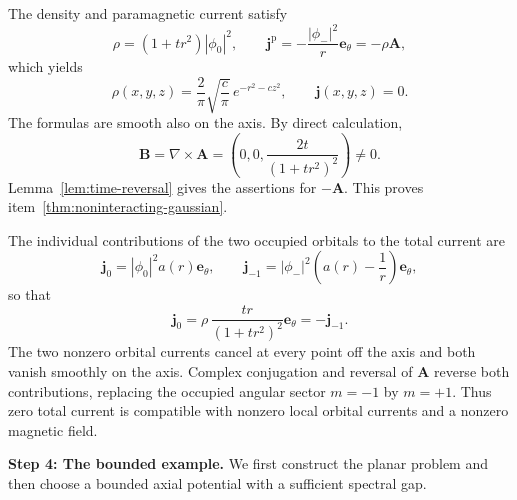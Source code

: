 \documentclass[11pt,a4paper]{article}
\theoremstyle{remark}
\theoremstyle{plain}
\newcommand{\jp}{\mathbf j^{\mathrm p}}
\newcommand{\jj}{\mathbf j}
\newcommand{\A}{\mathbf A}
\newcommand{\B}{\mathbf B}
\newcommand{\ee}{\mathbf e_\theta}
\begin{document}
The density and paramagnetic current satisfy
\begin{equation*}
 \rho=(1+tr^2)|\phi_0|^2,\qquad
 \jp=-\frac{|\phi_-|^2}{r}\ee=-\rho\A,
\end{equation*}
which yields
\begin{equation}
 \rho(x,y,z)=\frac2\pi\sqrt{\frac c\pi}\,e^{-r^2-cz^2},
 \qquad \jj(x,y,z)=0.
 \label{eq:gaussian-density-current}
\end{equation}The formulas are
smooth also on the axis. By direct calculation,
\begin{equation*}
 \B=\nabla\times\A=
 \left(0,0,\frac{2t}{(1+tr^2)^2}\right)\ne0.
\end{equation*}
Lemma~\ref{lem:time-reversal} gives the assertions for $-\A$.
This proves item~\ref{thm:noninteracting-gaussian}.

The individual contributions of the two occupied orbitals
to the total current are
\begin{equation*}
 \jj_0=|\phi_0|^2a(r)\ee,\qquad
 \jj_{-1}=|\phi_-|^2\left(a(r)-\frac1r\right)\ee,
\end{equation*}
so that
\begin{equation}
 \jj_0=\rho\,\frac{tr}{(1+tr^2)^2}\ee=-\jj_{-1}.
 \label{eq:orbital-current-cancellation}
\end{equation}
The two nonzero orbital currents cancel at every point off the axis
and both vanish smoothly on the axis. Complex conjugation and reversal
of $\A$ reverse both contributions, replacing the occupied angular
sector $m=-1$ by $m=+1$. Thus zero total current is compatible with
nonzero local orbital currents and a nonzero magnetic field.

\noindent\textbf{Step 4: The bounded example.}
We first construct the planar problem and then choose a bounded axial
potential with a sufficient spectral gap.
\end{document}
